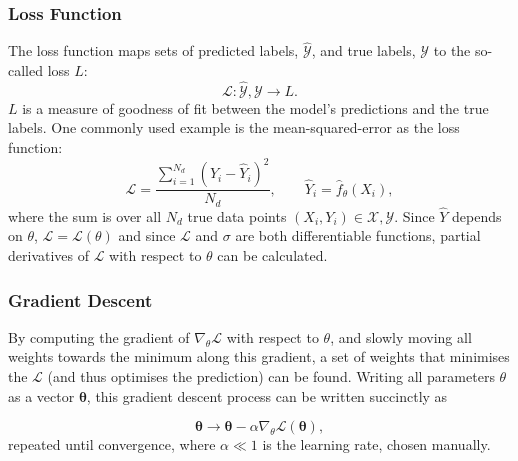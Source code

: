         \subsubsection{Loss Function}
            The loss function maps sets of predicted labels, $\mathcal{\hat{Y}}$, and true labels, $\mathcal{Y}$ to the so-called loss $L$: \[\mathcal{L} : \hat{\mathcal{Y}}, \mathcal{Y} \rightarrow L.\] $L$ is a measure of goodness of fit between the \gls{model}'s predictions and the true labels. One commonly used example is the mean-squared-error as the loss function:
            \begin{equation}
                \mathcal{L} = \frac{\sum_{i = 1}^{N_d}(Y_i - \hat{Y}_i)^2}{N_d}, \hspace{2em} \hat{Y}_i = \hat{f}_\theta(X_i),
            \end{equation}
            where the sum is over all $N_d$ true data points $(X_i, Y_i) \in \mathcal{X}, \mathcal{Y}$.
            Since $\hat{Y}$ depends on $\theta$, $\mathcal{L} = \mathcal{L}(\theta)$ and since $\mathcal{L}$ and $\sigma$ are both differentiable functions, partial derivatives of $\mathcal{L}$ with respect to $\theta$ can be calculated.

        \subsubsection{Gradient Descent}
            By computing the gradient of $\nabla_\theta \mathcal{L}$ with respect to $\theta$, and slowly moving all weights towards the minimum along this gradient, a set of weights that minimises the $\mathcal{L}$ (and thus optimises the prediction) can be found. Writing all parameters $\theta$ as a vector $\boldsymbol{\theta}$, this gradient descent process can be written succinctly as

            \begin{equation}
                \boldsymbol{\theta} \rightarrow \boldsymbol{\theta} - \alpha \nabla_\theta \mathcal{L}(\boldsymbol{\theta}),
            \end{equation}
            repeated until convergence, where $\alpha \ll 1$ is the learning rate, chosen manually.
